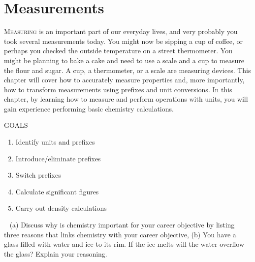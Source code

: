 \documentclass[main.tex]{subfiles}
\begin{document}
\linenumbers



\chapter[Measurements]{Measurements}
\label{ch:measurements}
 \begin{marginfigure}
\label{fig:marginfig}
\end{marginfigure}
\lettrine[lines=4]{\color{black!45}M}{easuring} is an important part of our everyday lives, and very probably you took several measurements today. You might now be sipping a cup of coffee, or perhaps you checked the outside temperature on a street thermometer. You might be planning to bake a cake and need to use a scale and a cup to measure the flour and sugar. A cup, a thermometer, or a scale are measuring devices. This chapter will cover how to accurately measure properties and, more importantly, how to transform measurements using prefixes and unit conversions. In this chapter, by learning how to measure and perform operations with units, you will gain experience performing basic chemistry calculations.
\begin{marginfigure}%
\begin{mytcbox}{GOALS}
\begin{enumerate}[label=\protect\circled{\color{white}\arabic*}]
\item Identify units and prefixes
\item Introduce/eliminate prefixes
\item Switch prefixes
\item Calculate significant figures
\item Carry out density calculations
\end{enumerate}
\end{mytcbox}
\vspace{1cm}
\begin{tcolorbox}[enhanced,colback=red!5!white,colframe=black!50!red,boxrule=1pt,
  arc=0pt,outer arc=0pt,drop heavy lifted shadow]
\faGears\ 
 (a) Discuss why is chemistry important for your career objective by listing three reasons that links chemistry with your career objective, (b) You have a glass filled with water and ice to its rim. If the ice melts will the water overflow the glass? Explain your reasoning. \end{tcolorbox}
\end{marginfigure}%
\end{document}

